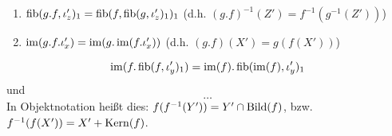 \begin{lemm}[Regel (d)] $\quad$ %
\begin{enumerate}
\item $\operatorname{fib}(g.f, \iota_z')_1 = \operatorname{fib}(f, \operatorname{fib}(g, \iota_z')_1)_1$ (d.h. $(g.f)^{-1}(Z') = f^{-1}(g^{-1}(Z'))$)
\item $\operatorname{im}(g.f.\iota_x') = \operatorname{im}(g.\operatorname{im}(f.\iota_x'))$ (d.h. $(g.f)(X') = g(f(X'))$)
\end{enumerate}
\end{lemm}

\begin{lemm}[Regel (e)]
\[
\operatorname{im}(f.\operatorname{fib}(f,\iota_y')_1) = \operatorname{im}(f).\operatorname{fib}(\operatorname{im}(f),\iota_y')_1
\]
und
\[
\ldots %
\]
In Objektnotation heißt dies: $f(f^{-1}(Y')) = Y' \cap \operatorname{Bild}(f)$, bzw. $f^{-1}(f(X')) = X' + \operatorname{Kern}(f)$.
\end{lemm}
